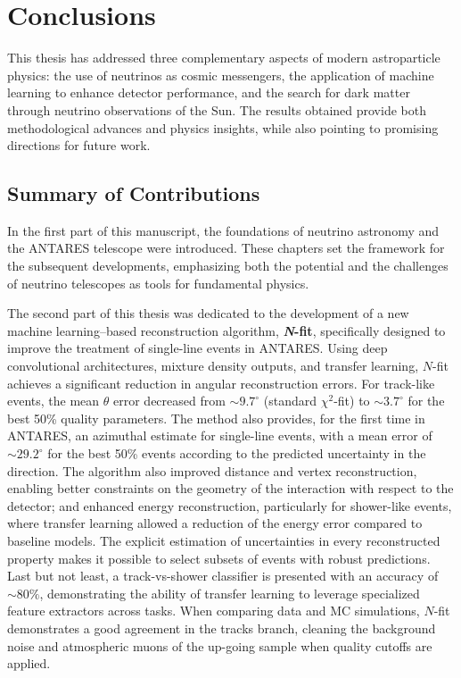 
\chapter*{Conclusions}
\label{chap:conclusions}

This thesis has addressed three complementary aspects of modern astroparticle physics: the use of neutrinos as cosmic messengers, the application of machine learning to enhance detector performance, and the search for dark matter through neutrino observations of the Sun. The results obtained provide both methodological advances and physics insights, while also pointing to promising directions for future work.

\section*{Summary of Contributions}

In the first part of this manuscript, the foundations of neutrino astronomy and the ANTARES telescope were introduced. These chapters set the framework for the subsequent developments, emphasizing both the potential and the challenges of neutrino telescopes as tools for fundamental physics.

The second part of this thesis was dedicated to the development of a new machine learning--based reconstruction algorithm, \textbf{\textit{N}-fit}, specifically designed to improve the treatment of single-line events in ANTARES. Using deep convolutional architectures, mixture density outputs, and transfer learning, $N$-fit achieves a significant reduction in angular reconstruction errors. For track-like events, the mean $\theta$ error decreased from $\sim 9.7^\circ$ (standard $\chi^2$-fit) to $\sim 3.7^\circ$ for the best 50\% quality parameters. The method also provides, for the first time in ANTARES, an azimuthal estimate for single-line events, with a mean error of $\sim 29.2^\circ$ for the best 50\% events according to the predicted uncertainty in the direction. The algorithm also improved distance and vertex reconstruction, enabling better constraints on the geometry of the interaction with respect to the detector; and enhanced energy reconstruction, particularly for shower-like events, where transfer learning allowed a reduction of the energy error compared to baseline models. The explicit estimation of uncertainties in every reconstructed property makes it possible to select subsets of events with robust predictions. Last but not least, a track-vs-shower classifier is presented with an accuracy of $\sim 80\%$, demonstrating the ability of transfer learning to leverage specialized feature extractors across tasks. When comparing data and MC simulations, $N$-fit demonstrates a good agreement in the tracks branch, cleaning the background noise and atmospheric muons of the up-going sample when quality cutoffs are applied.

